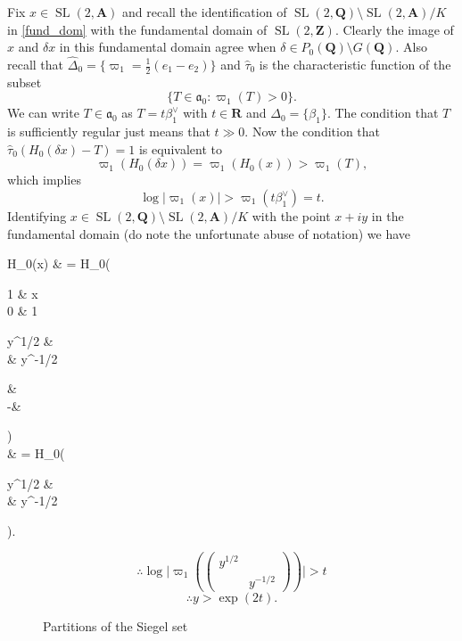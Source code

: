 \documentclass[11pt]{amsart}
\def\A{\mathbf A}
\def\Q{\mathbf Q}
\def\R{\mathbf R}
\def\Z{\mathbf Z}
\def\aaa{\mathfrak a}
\def\cb#1{{\color{black}#1}}
\def\bs{\setminus} 			%
\def\mod#1{\lvert #1 \rvert} %
\def\sl{\operatorname{SL}}
\theoremstyle{remark}
\begin{document}
\cb{Fix $x \in \sl(2, \A)$ and recall the identification of $\sl(2, \Q)\bs \sl(2, \A) / K$ in \cref{fund_dom} with the fundamental domain of $\sl(2, \Z)$. Clearly the image of $x$ and $\delta x$ in this fundamental domain agree when $\delta \in P_0(\Q) \bs G(\Q)$. 
Also recall that $\hat\Delta_0 = \{\varpi_1 = \frac{1}{2}(e_1 - e_2) \}$ and $\hat \tau_0$ is the characteristic function of the subset 
\[ \{ T \in \aaa_0 : \varpi_1(T) > 0 \}. \]
We can write $T \in \aaa_0$ as $T = t \beta_1^\vee$ with $t \in \R$ and $\Delta_0 = \{\beta_1\}$. The condition that $T$ is sufficiently regular just means that $t \gg 0$. Now the condition that $\hat\tau_0 (H_0(\delta x) - T) = 1$ is equivalent to 
\[ \varpi_1(H_0(\delta x)) = \varpi_1(H_0(x)) > \varpi_1(T), \]
which implies
\[ \log \mod{\varpi_1(x)} > \varpi_1(t \beta_1^\vee) = t. \]
Identifying $x \in \sl(2, \Q)\bs \sl(2, \A) / K$ with the point $x + iy$ in the fundamental domain (do note the unfortunate abuse of notation) we have
\begin{flalign*}
	H_0(x) & = H_0(\begin{pmatrix} 1 & x \\ 0 & 1 \end{pmatrix} \begin{pmatrix} y^{1/2} & \\ & y^{-1/2} \end{pmatrix} \begin{pmatrix} \cos \theta & \sin \theta \\ -\sin \theta & \cos \theta \end{pmatrix}) \\
			& = H_0(\begin{pmatrix} y^{1/2} & \\ & y^{-1/2} \end{pmatrix}).
\end{flalign*} 
\[ \therefore \log \mod{\varpi_1(\begin{pmatrix} y^{1/2} & \\ & y^{-1/2} \end{pmatrix})} > t \]
\[ \therefore y > \exp(2t). \]
}

\begin{figure}
\centering
\caption{Partitions of the Siegel set} \label{fig:sd}
\end{figure}
\end{document}
